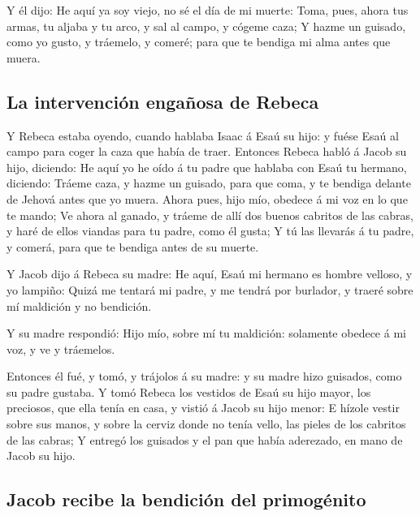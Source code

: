  Y él dijo: He aquí ya soy viejo, no sé el día de mi
muerte:  Toma, pues, ahora tus armas, tu aljaba y tu arco,
y sal al campo, y cógeme caza;  Y hazme un guisado, como
yo gusto, y tráemelo, y comeré; para que te bendiga mi alma antes que
muera.

\hypertarget{la-intervenciuxf3n-engauxf1osa-de-rebeca}{%
\subsection{La intervención engañosa de
Rebeca}\label{la-intervenciuxf3n-engauxf1osa-de-rebeca}}

 Y Rebeca estaba oyendo, cuando hablaba Isaac á Esaú su
hijo: y fuése Esaú al campo para coger la caza que había de traer.
 Entonces Rebeca habló á Jacob su hijo, diciendo: He aquí
yo he oído á tu padre que hablaba con Esaú tu hermano, diciendo:
 Tráeme caza, y hazme un guisado, para que coma, y te
bendiga delante de Jehová antes que yo muera.  Ahora pues,
hijo mío, obedece á mi voz en lo que te mando;  Ve ahora
al ganado, y tráeme de allí dos buenos cabritos de las cabras, y haré de
ellos viandas para tu padre, como él gusta;  Y tú las
llevarás á tu padre, y comerá, para que te bendiga antes de su muerte.

 Y Jacob dijo á Rebeca su madre: He aquí, Esaú mi hermano
es hombre velloso, y yo lampiño:  Quizá me tentará mi
padre, y me tendrá por burlador, y traeré sobre mí maldición y no
bendición.

 Y su madre respondió: Hijo mío, sobre mí tu maldición:
solamente obedece á mi voz, y ve y tráemelos.

 Entonces él fué, y tomó, y trájolos á su madre: y su
madre hizo guisados, como su padre gustaba.  Y tomó
Rebeca los vestidos de Esaú su hijo mayor, los preciosos, que ella tenía
en casa, y vistió á Jacob su hijo menor:  E hízole vestir
sobre sus manos, y sobre la cerviz donde no tenía vello, las pieles de
los cabritos de las cabras;  Y entregó los guisados y el
pan que había aderezado, en mano de Jacob su hijo.

\hypertarget{jacob-recibe-la-bendiciuxf3n-del-primoguxe9nito}{%
\subsection{Jacob recibe la bendición del
primogénito}\label{jacob-recibe-la-bendiciuxf3n-del-primoguxe9nito}}

